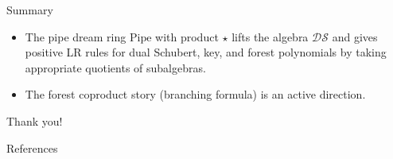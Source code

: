 \documentclass[aspectratio=169]{beamer}
\newcommand{\dcoma}{\mathcal{DS}}
\newcommand{\RC}{\mathrm{Pipe}}
\begin{document}
\begin{frame}{Summary}
  \begin{itemize}
    \item The pipe dream ring $\RC$ with product $\star$ lifts the algebra $\dcoma$ and gives positive LR rules for dual Schubert, key, and forest polynomials by taking appropriate quotients of subalgebras.
    \item The forest coproduct story (branching formula) is an active direction.
  \end{itemize}
  \vspace{0.5em}
  \centering Thank you!
\end{frame}

\begin{frame}[allowframebreaks]{References}
  
  
\end{frame}
\end{document}
